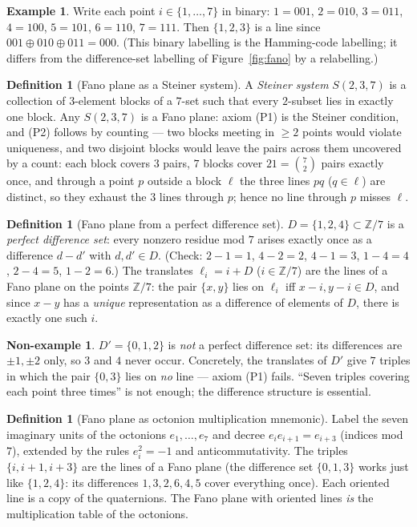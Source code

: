 \documentclass[11pt]{article}
\theoremstyle{definition}
\newtheorem{definition}[theorem]{Definition}
\newtheorem{example}[theorem]{Example}
\newtheorem{nonexample}[theorem]{Non-example}
\newcommand{\Z}{\mathbb{Z}}
\begin{document}
\begin{example}
Write each point $i\in\{1,\dots,7\}$ in binary: $1=001$, $2=010$, $3=011$,
$4=100$, $5=101$, $6=110$, $7=111$. Then $\{1,2,3\}$ is a line since
$001\oplus010\oplus011 = 000$. (This binary labelling is the Hamming-code
labelling; it differs from the difference-set labelling of
Figure~\ref{fig:fano} by a relabelling.)
\end{example}

\begin{definition}[Fano plane as a Steiner system]\label{def:fano-steiner}
A \emph{Steiner system} $S(2,3,7)$ is a collection of $3$-element blocks of a
$7$-set such that every $2$-subset lies in exactly one block. Any $S(2,3,7)$
is a Fano plane: axiom (P1) is the Steiner condition, and (P2) follows by
counting --- two blocks meeting in $\geq 2$ points would violate uniqueness,
and two disjoint blocks would leave the pairs across them uncovered by a
count: each block covers $3$ pairs, $7$ blocks cover $21 = \binom72$ pairs
exactly once, and through a point $p$ outside a block $\ell$ the three lines
$p q$ ($q\in\ell$) are distinct, so they exhaust the $3$ lines through $p$;
hence no line through $p$ misses $\ell$.
\end{definition}

\begin{definition}[Fano plane from a perfect difference set]\label{def:fano-diff}
$D = \{1,2,4\} \subset \Z/7$ is a \emph{perfect difference set}: every nonzero
residue mod $7$ arises exactly once as a difference $d - d'$ with $d,d'\in D$.
(Check: $2{-}1{=}1$, $4{-}2{=}2$, $4{-}1{=}3$, $1{-}4{=}4$, $2{-}4{=}5$,
$1{-}2{=}6$.) The translates $\ell_i = i + D$ ($i \in \Z/7$) are the lines of a
Fano plane on the points $\Z/7$: the pair $\{x,y\}$ lies on $\ell_i$ iff
$x-i, y-i \in D$, and since $x - y$ has a \emph{unique} representation as a
difference of elements of $D$, there is exactly one such $i$.
\end{definition}

\begin{nonexample}
$D' = \{0,1,2\}$ is \emph{not} a perfect difference set: its differences are
$\pm1, \pm2$ only, so $3$ and $4$ never occur. Concretely, the translates of
$D'$ give $7$ triples in which the pair $\{0,3\}$ lies on \emph{no} line ---
axiom (P1) fails. ``Seven triples covering each point three times'' is not
enough; the difference structure is essential.
\end{nonexample}

\begin{definition}[Fano plane as octonion multiplication mnemonic]\label{def:fano-oct}
Label the seven imaginary units of the octonions $e_1,\dots,e_7$ and decree
$e_i e_{i+1} = e_{i+3}$ (indices mod $7$), extended by the rules
$e_i^2 = -1$ and anticommutativity. The triples $\{i, i{+}1, i{+}3\}$ are the
lines of a Fano plane (the difference set $\{0,1,3\}$ works just like
$\{1,2,4\}$: its differences $1,3,2,6,4,5$ cover everything once). Each
oriented line is a copy of the quaternions. The Fano plane with oriented lines
\emph{is} the multiplication table of the octonions.
\end{definition}
\end{document}
